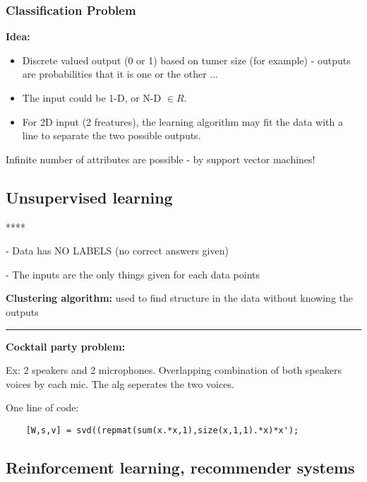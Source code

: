 \documentclass{article}
\begin{document}
\subsubsection{Classification Problem}

\begin{mybox}
\textbf{Idea:}
\begin{itemize}
    \item Discrete valued output (0 or 1) based on tumer size (for example) - outputs are probabilities that it is one or the other ...
    \item The input could be 1-D, or N-D $\in R$.
    \item For 2D input (2 freatures), the learning algorithm may fit the data with a line to separate the two possible outputs. 
\end{itemize}
\end{mybox}

Infinite number of attributes are possible - by support vector machines!










\subsection{Unsupervised learning}
****

- Data has NO LABELS (no correct answers given)

- The inputs are the only things given for each data points


\textbf{ Clustering algorithm:} used to find structure in the data without knowing the outputs



\par\noindent\rule{\textwidth}{0.4pt}



\textbf{Cocktail party problem:}

Ex: 2 speakers and 2 microphones. Overlapping combination of both speakers voices by each mic. The alg seperates the two voices.

One line of code: 

\begin{verbatim}
    [W,s,v] = svd((repmat(sum(x.*x,1),size(x,1,1).*x)*x');
\end{verbatim}




\subsection{Reinforcement learning, recommender systems} 
\end{document}
